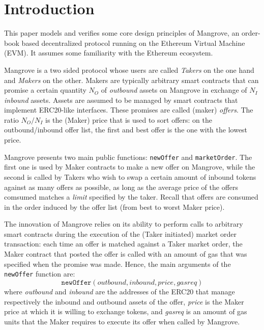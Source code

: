 \documentclass[12pt]{extarticle}
\begin{document}
\def\OOG{\mathsf{OOG}}

\def\vars{\ensuremath{\textit{Vars}}}
\def\vals{\ensuremath{\textit{Vals}}}
\def\valueOf{\textit{valueOf}}
\def\emptyVal{\textit{emptyValuation}}
\def\falseVal{\textit{false}}
\def\trueVal{\textit{true}}
\def\store{\textit{store}}

\def\bytecodes{\textit{Bytecodes}}
\def\bytecode{\textit{B}}
\def\code{\textit{code}}
\def\contracts{\textit{Contracts}}
\def\state{\textit{state}}
\def\states{\textit{States}}

\section{Introduction}
This paper models and verifies some core design principles of Mangrove, an order-book based decentralized protocol running on the Ethereum Virtual Machine (EVM). It assumes some familiarity with the Ethereum ecosystem. 

Mangrove is a two sided protocol whose users are called \emph{Takers} on the one hand and \emph{Makers} on the other. Makers are typically arbitrary smart contracts that can promise a certain quantity $N_O$ of \emph{outbound} assets on Mangrove in exchange of $N_I$ \emph{inbound} assets. Assets are assumed to be managed by smart contracts that implement ERC20-like interfaces. These promises are called (maker) \emph{offers}. The ratio $N_O/N_I$ is the (Maker) price that is used to sort offers: on the outbound/inbound offer list, the first and best offer is the one with the lowest price. 

Mangrove presents two main public functions: \texttt{newOffer} and \texttt{marketOrder}. The first one is used by Maker contracts to make a new offer on Mangrove, while the second is called by Takers who wish to swap a certain amount of inbound tokens against as many offers as possible, as long as the average price of the offers comsumed matches a \emph{limit} specified by the taker. Recall that offers are consumed in the order induced by the offer list (from best to worst Maker price).

The innovation of Mangrove relies on its ability to perform calls to arbitrary smart contracts during the execution of the (Taker initiated) market order transaction: each time an offer is matched against a Taker market order, the Maker contract that posted the offer is called with an amount of gas that was specified  when the promise was made. Hence, the main arguments of the \texttt{newOffer} function are:
$$
\mathtt{newOffer}(\mathit{outbound}, \mathit{inbound}, \mathit{price}, \mathit{gasreq})
$$
where \emph{outbound} and \emph{inbound} are the addresses of the ERC20 that manage respectively the inbound and outbound assets of the offer, \emph{price} is the Maker price at which it is willing to exchange tokens, and \emph{gasreq} is an amount of gas units that the Maker requires to execute its offer when called by Mangrove.
\end{document}
